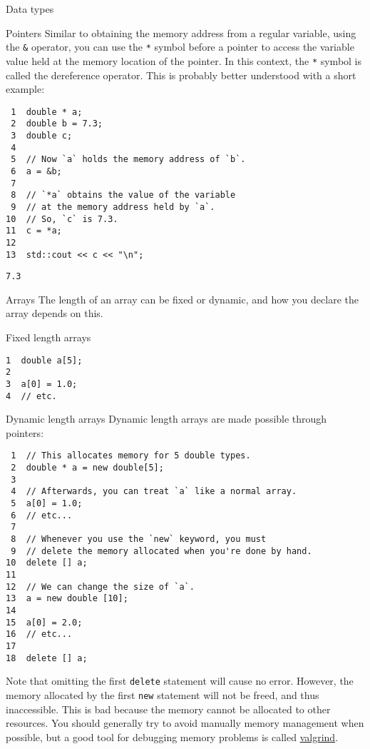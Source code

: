 \documentclass[presentation]{beamer}
\begin{document}
\begin{frame}[fragile,label={sec:orgheadline3}]{Data types}
\begin{block}{Pointers}
Similar to obtaining the memory address from a regular variable, using the
\texttt{\&} operator, you can use the \texttt{*} symbol before a pointer to access the 
variable value held at the memory location of the pointer. In this context,
the \texttt{*} symbol is called the \alert{dereference operator}. This is probably better 
understood with a short example:

\begin{verbatim}
 1  double * a;
 2  double b = 7.3;
 3  double c;
 4  
 5  // Now `a` holds the memory address of `b`.
 6  a = &b;
 7  
 8  // `*a` obtains the value of the variable
 9  // at the memory address held by `a`.
10  // So, `c` is 7.3.
11  c = *a;
12  
13  std::cout << c << "\n";
\end{verbatim}

\begin{verbatim}
7.3
\end{verbatim}
\end{block}

\begin{block}{Arrays}
The length of an array can be fixed or dynamic, and how you
declare the array depends on this.

\begin{block}{Fixed length arrays}
\begin{verbatim}
1  double a[5];
2  
3  a[0] = 1.0;
4  // etc.
\end{verbatim}
\end{block}

\begin{block}{Dynamic length arrays}
Dynamic length arrays are made possible through pointers:

\begin{verbatim}
 1  // This allocates memory for 5 double types.
 2  double * a = new double[5];
 3  
 4  // Afterwards, you can treat `a` like a normal array.
 5  a[0] = 1.0;
 6  // etc...
 7  
 8  // Whenever you use the `new` keyword, you must
 9  // delete the memory allocated when you're done by hand.
10  delete [] a;
11  
12  // We can change the size of `a`.
13  a = new double [10];
14  
15  a[0] = 2.0;
16  // etc...
17  
18  delete [] a;
\end{verbatim}

Note that omitting the first \texttt{delete} statement will cause no error. 
However, the memory allocated by the first \texttt{new} statement will not 
be freed, and thus inaccessible. This is bad because the memory cannot 
be allocated to other resources. You should generally try to avoid 
manually memory management when possible, but a good tool for debugging 
memory problems is called \href{http://valgrind.org/}{valgrind}. 
\end{block}
\end{block}
\end{frame}
\end{document}
